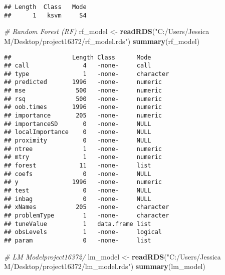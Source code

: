 \documentclass[
]{article}
\newenvironment{Shaded}{\begin{snugshade}}{\end{snugshade}}
\newcommand{\CommentTok}[1]{\textcolor[rgb]{0.56,0.35,0.01}{\textit{#1}}}
\newcommand{\FunctionTok}[1]{\textcolor[rgb]{0.13,0.29,0.53}{\textbf{#1}}}
\newcommand{\NormalTok}[1]{#1}
\newcommand{\OtherTok}[1]{\textcolor[rgb]{0.56,0.35,0.01}{#1}}
\newcommand{\StringTok}[1]{\textcolor[rgb]{0.31,0.60,0.02}{#1}}
\begin{document}
\begin{verbatim}
## Length  Class   Mode 
##      1   ksvm     S4
\end{verbatim}

\begin{Shaded}
\begin{Highlighting}[]
\CommentTok{\# Random Forest (RF)}
\NormalTok{rf\_model }\OtherTok{\textless{}{-}} \FunctionTok{readRDS}\NormalTok{(}\StringTok{"C:/Users/Jessica M/Desktop/project16372/rf\_model.rds"}\NormalTok{)}
\FunctionTok{summary}\NormalTok{(rf\_model)}
\end{Highlighting}
\end{Shaded}

\begin{verbatim}
##                 Length Class      Mode     
## call               4   -none-     call     
## type               1   -none-     character
## predicted       1996   -none-     numeric  
## mse              500   -none-     numeric  
## rsq              500   -none-     numeric  
## oob.times       1996   -none-     numeric  
## importance       205   -none-     numeric  
## importanceSD       0   -none-     NULL     
## localImportance    0   -none-     NULL     
## proximity          0   -none-     NULL     
## ntree              1   -none-     numeric  
## mtry               1   -none-     numeric  
## forest            11   -none-     list     
## coefs              0   -none-     NULL     
## y               1996   -none-     numeric  
## test               0   -none-     NULL     
## inbag              0   -none-     NULL     
## xNames           205   -none-     character
## problemType        1   -none-     character
## tuneValue          1   data.frame list     
## obsLevels          1   -none-     logical  
## param              0   -none-     list
\end{verbatim}

\begin{Shaded}
\begin{Highlighting}[]
\CommentTok{\# LM Modelproject16372/}
\NormalTok{lm\_model }\OtherTok{\textless{}{-}} \FunctionTok{readRDS}\NormalTok{(}\StringTok{"C:/Users/Jessica M/Desktop/project16372/lm\_model.rds"}\NormalTok{)}
\FunctionTok{summary}\NormalTok{(lm\_model)}
\end{Highlighting}
\end{Shaded}
\end{document}
